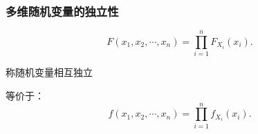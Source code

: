 \subsubsection{多维随机变量的独立性}%
\label{subsub:多维随机变量的独立性}
\begin{defi}
    \[
        F\left( x_1,x_2,\cdots,x_n \right) =\prod_{i=1}^{n} F_{X_i}\left( x_i \right) 
    .\] 

    称随机变量相互独立

    等价于：\[
        f\left( x_1,x_2,\cdots,x_n \right) =\prod_{i=1}^{n} f_{X_i}\left( x_i \right)  
    .\] 
\end{defi}

